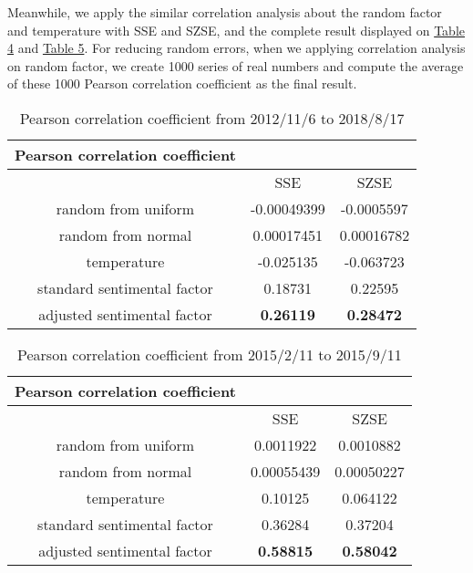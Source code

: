 \documentclass[10pt, conference, compsocconf]{IEEEtran}
\begin{document}
Meanwhile, we apply the similar correlation analysis about the random factor and temperature with SSE and SZSE, and the complete result displayed on \hyperref[Table 4]{Table 4} and \hyperref[Table 5]{Table 5}. For reducing random errors, when we applying correlation analysis on random factor, we create 1000 series of real numbers and compute the average of these 1000 Pearson correlation coefficient as the final result.

\begin{table}[!ht]
    \centering
    \begin{tabular}{ccc}
        \hline
        \textbf{Pearson correlation coefficient}\\
        \hline
        {} & {SSE} & {SZSE} \\
        \hline
        {random from uniform} & {-0.00049399} & {-0.0005597} \\
        {random from normal} & {0.00017451} & {0.00016782} \\
        {temperature} & {-0.025135} & {-0.063723}\\
        {standard sentimental factor} & {0.18731} & {0.22595}\\
        {adjusted sentimental factor} & {\textbf{0.26119}} & {\textbf{0.28472}}\\
        \hline
    \end{tabular}
    \caption{Pearson correlation coefficient from 2012/11/6 to 2018/8/17}\label{Table 4}
\end{table}

\begin{table}[!ht]
    \centering
    \begin{tabular}{ccc}
        \hline
        \textbf{Pearson correlation coefficient}\\
        \hline
        {} & {SSE} & {SZSE} \\
        \hline
        {random from uniform} & {0.0011922} & {0.0010882} \\
        {random from normal} & {0.00055439} & {0.00050227} \\
        {temperature} & {0.10125} & {0.064122}\\
        {standard sentimental factor} & {0.36284} & {0.37204}\\
        {adjusted sentimental factor} & {\textbf{0.58815}} & {\textbf{0.58042}}\\
        \hline
    \end{tabular}
    \caption{Pearson correlation coefficient from 2015/2/11 to 2015/9/11}\label{Table 5}
\end{table}
\end{document}
